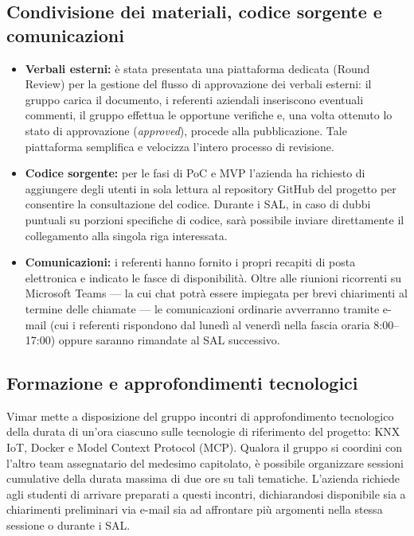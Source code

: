 \documentclass[11pt, a4paper]{article}
\begin{document}
\subsection{Condivisione dei materiali, codice sorgente e comunicazioni}
\begin{itemize}
    \item \textbf{Verbali esterni:} è stata presentata una piattaforma dedicata (Round Review) per la gestione del flusso di approvazione dei verbali esterni: il gruppo carica il documento, i referenti aziendali inseriscono eventuali commenti, il gruppo effettua le opportune verifiche e, una volta ottenuto lo stato di approvazione (\emph{approved}), procede alla pubblicazione. Tale piattaforma semplifica e velocizza l'intero processo di revisione.
    \item \textbf{Codice sorgente:} per le fasi di PoC e MVP l'azienda ha richiesto di aggiungere degli utenti in sola lettura al repository GitHub del progetto per consentire la consultazione del codice. Durante i SAL, in caso di dubbi puntuali su porzioni specifiche di codice, sarà possibile inviare direttamente il collegamento alla singola riga interessata.
    \item \textbf{Comunicazioni:} i referenti hanno fornito i propri recapiti di posta elettronica e indicato le fasce di disponibilità. Oltre alle riunioni ricorrenti su Microsoft Teams --- la cui chat potrà essere impiegata per brevi chiarimenti al termine delle chiamate --- le comunicazioni ordinarie avverranno tramite e-mail (cui i referenti rispondono dal lunedì al venerdì nella fascia oraria 8:00--17:00) oppure saranno rimandate al SAL successivo.
\end{itemize}

\subsection{Formazione e approfondimenti tecnologici}
Vimar mette a disposizione del gruppo incontri di approfondimento tecnologico della durata di un'ora ciascuno sulle tecnologie di riferimento del progetto: KNX IoT, Docker e Model Context Protocol (MCP). Qualora il gruppo si coordini con l'altro team assegnatario del medesimo capitolato, è possibile organizzare sessioni cumulative della durata massima di due ore su tali tematiche. L'azienda richiede agli studenti di arrivare preparati a questi incontri, dichiarandosi disponibile sia a chiarimenti preliminari via e-mail sia ad affrontare più argomenti nella stessa sessione o durante i SAL.
\end{document}
